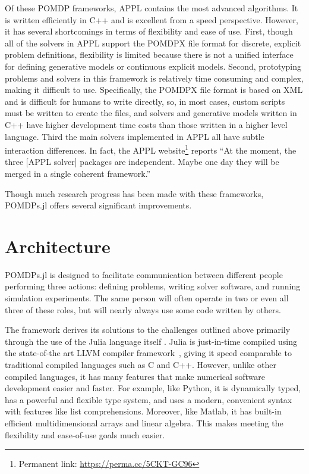 Of these POMDP frameworks, APPL contains the most advanced algorithms.
It is written efficiently in C++ and is excellent from a speed perspective.
However, it has several shortcomings in terms of flexibility and ease of use.
First, though all of the solvers in APPL support the POMDPX file format for discrete, explicit problem definitions, flexibility is limited because there is not a unified interface for defining generative models or continuous explicit models.
Second, prototyping problems and solvers in this framework is relatively time consuming and complex, making it difficult to use.
Specifically, the POMDPX file format is based on XML and is difficult for humans to write directly, so, in most cases, custom scripts must be written to create the files, and solvers and generative models written in C++ have higher development time costs than those written in a higher level language.
Third the main solvers implemented in APPL all have subtle interaction differences.
In fact, the APPL website\footnote{Permanent link: \url{https://perma.cc/5CKT-GC96}} reports ``At the moment, the three [APPL solver] packages are independent. Maybe one day they will be merged in a single coherent framework.''

Though much research progress has been made with these frameworks, POMDPs.jl offers several significant improvements.

\section{Architecture}

POMDPs.jl is designed to facilitate communication between different people performing three actions: defining problems, writing solver software, and running simulation experiments.
The same person will often operate in two or even all three of these roles, but will nearly always use some code written by others.

The framework derives its solutions to the challenges outlined above primarily through the use of the Julia language itself \cite{bezanson2017julia}.
Julia is just-in-time compiled using the state-of-the art LLVM compiler framework~\cite{lattner2004llvm}, giving it speed comparable to traditional compiled languages such as C and C++.
However, unlike other compiled languages, it has many features that make numerical software development easier and faster.
For example, like Python, it is dynamically typed, has a powerful and flexible type system, and uses a modern, convenient syntax with features like list comprehensions.
Moreover, like Matlab, it has built-in efficient multidimensional arrays and linear algebra.
This makes meeting the flexibility and ease-of-use goals much easier.


